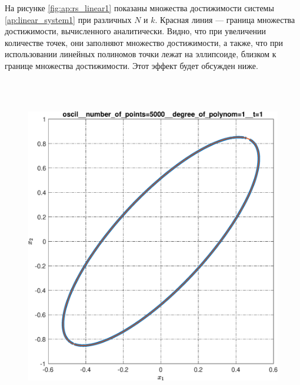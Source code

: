 \documentclass[../main.tex]{subfiles}
\begin{document}
  На рисунке \ref{fig:ap:rs_linear1} показаны множества достижимости системы \eqref{ap:linear_system1} при различных $N$ и $k$.
  Красная линия --- граница множества достижимости, вычисленного аналитически.
  Видно, что при увеличении количестве точек, они заполняют множество достижимости, а также, что при использовании линейных полиномов точки лежат на эллипсоиде, близком к границе множества достижимости. 
  Этот эффект будет обсужден ниже.
  
   \begin{figure}[ht!] 
  	\hspace{-2.5ex}
  	\begin{minipage}[b]{.3\linewidth} 
  		\small
  		\centering 
  		\includegraphics[width=\linewidth]{images/oscil__number_of_points=5000__degree_of_polynom=1__t=1.eps}
  	\end{minipage}
  	\hfill
  	\begin{minipage}[b]{.3\linewidth} 
  		\small
  		\centering

\end{minipage}
\end{figure}
\end{document}

